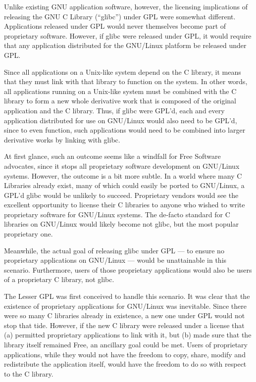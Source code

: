 \documentclass[12pt]{report}
\begin{document}
Unlike existing GNU application software, however, the licensing
implications of releasing the GNU C Library (``glibc'') under GPL were
somewhat different.  Applications released under GPL would never
themselves become part of proprietary software.  However, if glibc were
released under GPL, it would require that any application distributed for
the GNU/Linux platform be released under GPL.

Since all applications on a Unix-like system depend on the C library, it
means that they must link with that library to function on the system.  In
other words, all applications running on a Unix-like system must be
combined with the C library to form a new whole derivative work that is
composed of the original application and the C library.  Thus, if glibc
were GPL'd, each and every application distributed for use on GNU/Linux
would also need to be GPL'd, since to even function, such applications
would need to be combined into larger derivative works by linking with
glibc.

At first glance, such an outcome seems like a windfall for Free Software
advocates, since it stops all proprietary software development on
GNU/Linux systems.  However, the outcome is a bit more subtle.  In a world
where many C Libraries already exist, many of which could easily be ported
to GNU/Linux, a GPL'd glibc would be unlikely to succeed.  Proprietary
vendors would see the excellent opportunity to license their C libraries to
anyone who wished to write proprietary software for GNU/Linux systems.
The de-facto standard for C libraries on GNU/Linux would likely become not
glibc, but the most popular proprietary one.

Meanwhile, the actual goal of releasing glibc under GPL --- to ensure no
proprietary applications on GNU/Linux --- would be unattainable in this
scenario.  Furthermore, users of those proprietary applications would also
be users of a proprietary C library, not glibc.

The Lesser GPL was first conceived to handle this scenario.  It was clear
that the existence of proprietary applications for GNU/Linux was
inevitable.  Since there were so many C libraries already in existence, a
new one under GPL would not stop that tide.  However, if the new C library
were released under a license that (a) permitted proprietary applications
to link with it, but (b) made sure that the library itself remained Free,
an ancillary goal could be met.  Users of proprietary applications, while
they would not have the freedom to copy, share, modify and redistribute
the application itself, would have the freedom to do so with respect to
the C library.
\end{document}
